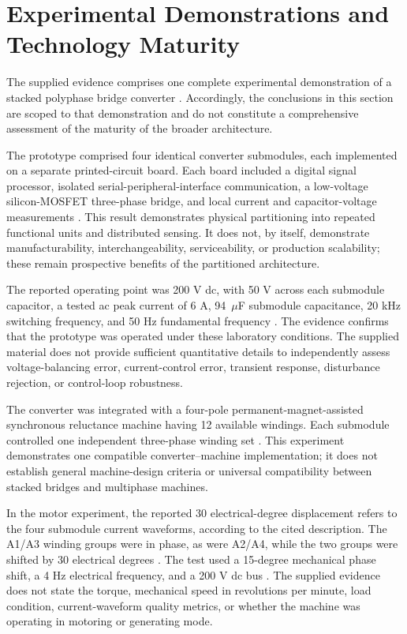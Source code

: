 \section{Experimental Demonstrations and Technology Maturity}

The supplied evidence comprises one complete experimental demonstration of a stacked polyphase bridge converter \cite{Jin2017}. Accordingly, the conclusions in this section are scoped to that demonstration and do not constitute a comprehensive assessment of the maturity of the broader architecture. %

The prototype comprised four identical converter submodules, each implemented on a separate printed-circuit board. Each board included a digital signal processor, isolated serial-peripheral-interface communication, a low-voltage silicon-MOSFET three-phase bridge, and local current and capacitor-voltage measurements \cite{Jin2017}. This result demonstrates physical partitioning into repeated functional units and distributed sensing. It does not, by itself, demonstrate manufacturability, interchangeability, serviceability, or production scalability; these remain prospective benefits of the partitioned architecture.

The reported operating point was 200 V dc, with 50 V across each submodule capacitor, a tested ac peak current of 6 A, 94~$\mu$F submodule capacitance, 20 kHz switching frequency, and 50 Hz fundamental frequency \cite{Jin2017}. The evidence confirms that the prototype was operated under these laboratory conditions. The supplied material does not provide sufficient quantitative details to independently assess voltage-balancing error, current-control error, transient response, disturbance rejection, or control-loop robustness. %

The converter was integrated with a four-pole permanent-magnet-assisted synchronous reluctance machine having 12 available windings. Each submodule controlled one independent three-phase winding set \cite{Jin2017}. This experiment demonstrates one compatible converter--machine implementation; it does not establish general machine-design criteria or universal compatibility between stacked bridges and multiphase machines.

In the motor experiment, the reported 30 electrical-degree displacement refers to the four submodule current waveforms, according to the cited description. The A1/A3 winding groups were in phase, as were A2/A4, while the two groups were shifted by 30 electrical degrees \cite{Jin2017}. The test used a 15-degree mechanical phase shift, a 4 Hz electrical frequency, and a 200 V dc bus \cite{Jin2017}. The supplied evidence does not state the torque, mechanical speed in revolutions per minute, load condition, current-waveform quality metrics, or whether the machine was operating in motoring or generating mode. %

